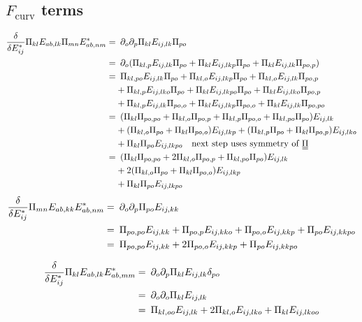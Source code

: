 \documentclass[11pt]{article}
\begin{document}
\subsection{$F_\text{curv}$ terms}
\begin{align}
    \fdv{E_{ij}^*} \Pi_{kl}E_{ab,lk}\Pi_{mn}E_{ab,nm}^* =&\enspace \pp_o\pp_p \Pi_{kl}E_{ij,lk}\Pi_{po} \\
    =&\enspace \pp_o (\Pi_{kl,p}E_{ij,lk}\Pi_{po} + \Pi_{kl}E_{ij,lkp}\Pi_{po} + \Pi_{kl}E_{ij,lk}\Pi_{po,p}) \\
    =&\enspace \Pi_{kl,po}E_{ij,lk}\Pi_{po} + \Pi_{kl,o}E_{ij,lkp}\Pi_{po} + \Pi_{kl,o}E_{ij,lk}\Pi_{po,p} \\
    &+ \Pi_{kl,p}E_{ij,lko}\Pi_{po} + \Pi_{kl}E_{ij,lkpo}\Pi_{po} + \Pi_{kl}E_{ij,lko}\Pi_{po,p} \nonumber \\
    &+ \Pi_{kl,p}E_{ij,lk}\Pi_{po,o} + \Pi_{kl}E_{ij,lkp}\Pi_{po,o} + \Pi_{kl}E_{ij,lk}\Pi_{po,po} \nonumber \\
    =&\enspace (\Pi_{kl}\Pi_{po,po} + \Pi_{kl,o}\Pi_{po,p} + \Pi_{kl,p}\Pi_{po,o} + \Pi_{kl,po}\Pi_{po})E_{ij,lk} \\
    &+ (\Pi_{kl,o}\Pi_{po} + \Pi_{kl}\Pi_{po,o})E_{ij,lkp} + (\Pi_{kl,p}\Pi_{po} + \Pi_{kl}\Pi_{po,p})E_{ij,lko} \nonumber \\
    &+ \Pi_{kl}\Pi_{po}E_{ij,lkpo} \qq{next step uses symmetry of \PP} \nonumber \\
    =&\enspace (\Pi_{kl}\Pi_{po,po} + 2\Pi_{kl,o}\Pi_{po,p} + \Pi_{kl,po}\Pi_{po})E_{ij,lk} \\
    &+ 2(\Pi_{kl,o}\Pi_{po} + \Pi_{kl}\Pi_{po,o})E_{ij,lkp} \nonumber \\
    &+ \Pi_{kl}\Pi_{po}E_{ij,lkpo} \nonumber
\end{align}
\begin{align}
    \fdv{E_{ij}^*} \Pi_{mn}E_{ab,kk}E_{ab,nm}^* =&\enspace \pp_o\pp_p \Pi_{po}E_{ij,kk} \\
    =&\enspace \Pi_{po,po}E_{ij,kk} + \Pi_{po,p}E_{ij,kko} + \Pi_{po,o}E_{ij,kkp} + \Pi_{po}E_{ij,kkpo} \\
    =&\enspace \Pi_{po,po}E_{ij,kk} + 2\Pi_{po,o}E_{ij,kkp} + \Pi_{po}E_{ij,kkpo}
\end{align}

\begin{align}
    \fdv{E_{ij}^*} \Pi_{kl}E_{ab,lk}E_{ab,mm}^* =&\enspace \pp_o\pp_p \Pi_{kl}E_{ij,lk} \delta_{po} \\
    =&\enspace \pp_o\pp_o \Pi_{kl}E_{ij,lk} \\
    =&\enspace \Pi_{kl,oo}E_{ij,lk} + 2\Pi_{kl,o}E_{ij,lko} + \Pi_{kl}E_{ij,lkoo}
\end{align}
\end{document}
